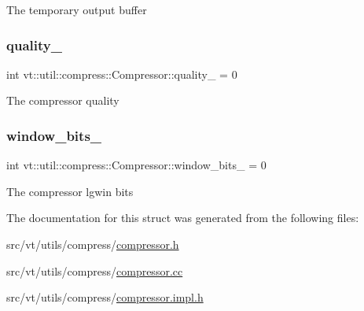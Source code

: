The temporary output buffer \mbox{\label{structvt_1_1util_1_1compress_1_1_compressor_a3a880299b41bc07ba175cd65aa1b7fd2}} 
\subsubsection{\texorpdfstring{quality\+\_\+}{quality\_}}
{\footnotesize\ttfamily int vt\+::util\+::compress\+::\+Compressor\+::quality\+\_\+ = 0\hspace{0.3cm}{\ttfamily [private]}}

The compressor quality \mbox{\label{structvt_1_1util_1_1compress_1_1_compressor_ab446c4e6d76b2444a09ccb763bcd159f}} 
\subsubsection{\texorpdfstring{window\+\_\+bits\+\_\+}{window\_bits\_}}
{\footnotesize\ttfamily int vt\+::util\+::compress\+::\+Compressor\+::window\+\_\+bits\+\_\+ = 0\hspace{0.3cm}{\ttfamily [private]}}

The compressor lgwin bits 

The documentation for this struct was generated from the following files\+:\begin{DoxyCompactItemize}
\item 
src/vt/utils/compress/\hyperlink{compressor_8h}{compressor.\+h}\item 
src/vt/utils/compress/\hyperlink{compressor_8cc}{compressor.\+cc}\item 
src/vt/utils/compress/\hyperlink{compressor_8impl_8h}{compressor.\+impl.\+h}\end{DoxyCompactItemize}
